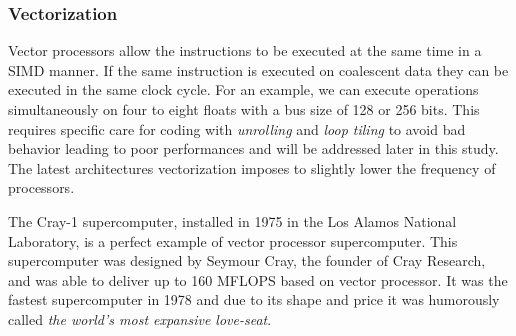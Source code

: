 \subsubsection{Vectorization} 
Vector processors allow the instructions to be executed at the same time in a SIMD manner. 
If the same instruction is executed on coalescent data they can be executed in the same clock cycle. 
For an example, we can execute operations simultaneously on four to eight floats with a bus size of 128 or 256 bits.
This requires specific care for coding with \textit{unrolling} and \textit{loop tiling} to avoid bad behavior leading to poor performances and will be addressed later in this study.
The latest architectures vectorization imposes to slightly lower the frequency of processors. 

The Cray-1 supercomputer\cite{russell1978cray}, installed in 1975 in the Los Alamos National Laboratory, is a perfect example of vector processor supercomputer.
This supercomputer was designed by Seymour Cray, the founder of Cray Research, and was able to deliver up to 160 MFLOPS based on vector processor.
It was the fastest supercomputer in 1978 and due to its shape and price it was humorously called \textit{the world's most expansive love-seat}. 


